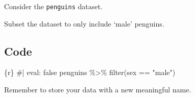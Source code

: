 \documentclass[
  letterpaper,
  DIV=11,
  numbers=noendperiod]{scrreprt}
\newenvironment{Shaded}{\begin{snugshade}}{\end{snugshade}}
\newcommand{\CommentTok}[1]{\textcolor[rgb]{0.37,0.37,0.37}{#1}}
\newcommand{\FunctionTok}[1]{\textcolor[rgb]{0.28,0.35,0.67}{#1}}
\newcommand{\InformationTok}[1]{\textcolor[rgb]{0.37,0.37,0.37}{#1}}
\newcommand{\NormalTok}[1]{\textcolor[rgb]{0.00,0.23,0.31}{#1}}
\newcommand{\SpecialCharTok}[1]{\textcolor[rgb]{0.37,0.37,0.37}{#1}}
\newcommand{\StringTok}[1]{\textcolor[rgb]{0.13,0.47,0.30}{#1}}
\begin{document}
\begin{tcolorbox}[enhanced jigsaw, colframe=quarto-callout-note-color-frame, breakable, colback=white, toprule=.15mm, leftrule=.75mm, left=2mm, opacityback=0, rightrule=.15mm, arc=.35mm, bottomrule=.15mm]
Consider the \texttt{penguins} dataset.

Subset the dataset to only include `male' penguins.

\hypertarget{code-2}{%
\subsection*{Code}\label{code-2}}

\begin{Shaded}
\begin{Highlighting}[]
\InformationTok{\textasciigrave{}\textasciigrave{}\textasciigrave{}\{r\}}
\CommentTok{\#| eval: false}
\NormalTok{penguins }\SpecialCharTok{\%\textgreater{}\%} 
  \FunctionTok{filter}\NormalTok{(sex }\SpecialCharTok{==} \StringTok{"male"}\NormalTok{)}
\InformationTok{\textasciigrave{}\textasciigrave{}\textasciigrave{}}
\end{Highlighting}
\end{Shaded}

Remember to store your data with a new meaningful name.
\end{tcolorbox}
\end{document}

